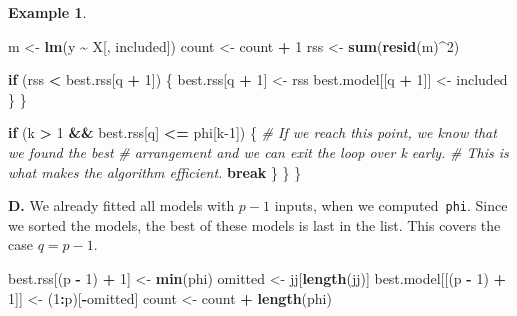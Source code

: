 \documentclass[
  a4paper,
]{article}
\newenvironment{Shaded}{\begin{snugshade}}{\end{snugshade}}
\newcommand{\CommentTok}[1]{\textcolor[rgb]{0.56,0.35,0.01}{\textit{#1}}}
\newcommand{\ControlFlowTok}[1]{\textcolor[rgb]{0.13,0.29,0.53}{\textbf{#1}}}
\newcommand{\DecValTok}[1]{\textcolor[rgb]{0.00,0.00,0.81}{#1}}
\newcommand{\FunctionTok}[1]{\textcolor[rgb]{0.13,0.29,0.53}{\textbf{#1}}}
\newcommand{\NormalTok}[1]{#1}
\newcommand{\OtherTok}[1]{\textcolor[rgb]{0.56,0.35,0.01}{#1}}
\newcommand{\SpecialCharTok}[1]{\textcolor[rgb]{0.81,0.36,0.00}{\textbf{#1}}}
\theoremstyle{definition}
\theoremstyle{definition}
\newtheorem{example}{Example}[section]
\theoremstyle{definition}
\theoremstyle{definition}
\theoremstyle{remark}
\begin{document}
\begin{example}
\begin{Shaded}
\begin{Highlighting}[]
\NormalTok{            m }\OtherTok{\textless{}{-}} \FunctionTok{lm}\NormalTok{(y }\SpecialCharTok{\textasciitilde{}}\NormalTok{ X[, included])}
\NormalTok{            count }\OtherTok{\textless{}{-}}\NormalTok{ count }\SpecialCharTok{+} \DecValTok{1}
\NormalTok{            rss }\OtherTok{\textless{}{-}} \FunctionTok{sum}\NormalTok{(}\FunctionTok{resid}\NormalTok{(m)}\SpecialCharTok{\^{}}\DecValTok{2}\NormalTok{)}

            \ControlFlowTok{if}\NormalTok{ (rss }\SpecialCharTok{\textless{}}\NormalTok{ best.rss[q }\SpecialCharTok{+} \DecValTok{1}\NormalTok{]) \{}
\NormalTok{                best.rss[q }\SpecialCharTok{+} \DecValTok{1}\NormalTok{] }\OtherTok{\textless{}{-}}\NormalTok{ rss}
\NormalTok{                best.model[[q }\SpecialCharTok{+} \DecValTok{1}\NormalTok{]] }\OtherTok{\textless{}{-}}\NormalTok{ included}
\NormalTok{            \}}
\NormalTok{        \}}

        \ControlFlowTok{if}\NormalTok{ (k }\SpecialCharTok{\textgreater{}} \DecValTok{1} \SpecialCharTok{\&\&}\NormalTok{ best.rss[q] }\SpecialCharTok{\textless{}=}\NormalTok{ phi[k}\DecValTok{{-}1}\NormalTok{]) \{}
            \CommentTok{\# If we reach this point, we know that we found the best}
            \CommentTok{\# arrangement and we can exit the loop over k early.}
            \CommentTok{\# This is what makes the algorithm efficient.}
            \ControlFlowTok{break}
\NormalTok{        \}}
\NormalTok{    \}}
\NormalTok{\}}
\end{Highlighting}
\end{Shaded}

\textbf{D.} We already fitted all models with \(p-1\) inputs, when we computed~\texttt{phi}.
Since we sorted the models, the best of these models is last in the list.
This covers the case \(q = p - 1\).

\begin{Shaded}
\begin{Highlighting}[]
\NormalTok{best.rss[(p }\SpecialCharTok{{-}} \DecValTok{1}\NormalTok{) }\SpecialCharTok{+} \DecValTok{1}\NormalTok{] }\OtherTok{\textless{}{-}} \FunctionTok{min}\NormalTok{(phi)}
\NormalTok{omitted }\OtherTok{\textless{}{-}}\NormalTok{ jj[}\FunctionTok{length}\NormalTok{(jj)]}
\NormalTok{best.model[[(p }\SpecialCharTok{{-}} \DecValTok{1}\NormalTok{) }\SpecialCharTok{+} \DecValTok{1}\NormalTok{]] }\OtherTok{\textless{}{-}}\NormalTok{ (}\DecValTok{1}\SpecialCharTok{:}\NormalTok{p)[}\SpecialCharTok{{-}}\NormalTok{omitted]}
\NormalTok{count }\OtherTok{\textless{}{-}}\NormalTok{ count }\SpecialCharTok{+} \FunctionTok{length}\NormalTok{(phi)}
\end{Highlighting}
\end{Shaded}


\end{example}
\end{document}
